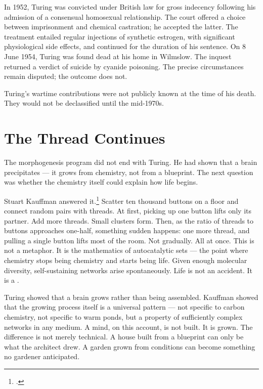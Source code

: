 
In 1952, Turing was convicted under British law for gross indecency following his admission of a consensual homosexual relationship. The court offered a choice between imprisonment and chemical castration; he accepted the latter. The treatment entailed regular injections of synthetic estrogen, with significant physiological side effects, and continued for the duration of his sentence. On 8 June 1954, Turing was found dead at his home in Wilmslow. The inquest returned a verdict of suicide by cyanide poisoning. The precise circumstances remain disputed; the outcome does not.

Turing's wartime contributions were not publicly known at the time of his death. They would not be declassified until the mid-1970s.

\section*{The Thread Continues}

The morphogenesis program did not end with Turing. He had shown that a brain precipitates --- it grows from chemistry, not from a blueprint. The next question was whether the chemistry itself could explain how life begins.

Stuart Kauffman answered it.\footcite{kauffman1993} Scatter ten thousand buttons on a floor and connect random pairs with threads. At first, picking up one button lifts only its partner. Add more threads. Small clusters form. Then, as the ratio of threads to buttons approaches one-half, something sudden happens: one more thread, and pulling a single button lifts most of the room. Not gradually. All at once. This is not a metaphor. It is the mathematics of autocatalytic sets --- the point where chemistry stops being chemistry and starts being life. Given enough molecular diversity, self-sustaining networks arise spontaneously. Life is not an accident. It is a .

Turing showed that a brain grows rather than being assembled. Kauffman showed that the growing process itself is a universal pattern --- not specific to carbon chemistry, not specific to warm ponds, but a property of sufficiently complex networks in any medium. A mind, on this account, is not built. It is grown. The difference is not merely technical. A house built from a blueprint can only be what the architect drew. A garden grown from conditions can become something no gardener anticipated.


